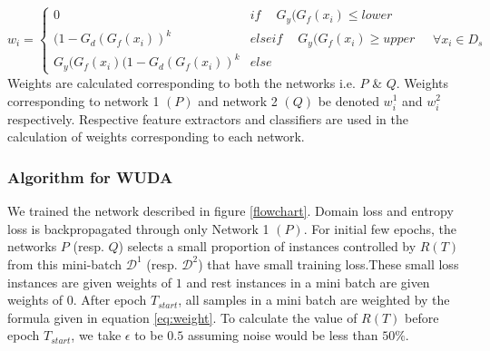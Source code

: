\begin{equation}
\label{eq:weight}
                w_{i} = \begin{cases}
		            0 & if\ \quad G_y(G_f(x_i) \le lower \\
		            (1 - G_d(G_f(x_i))^k & elseif\ \quad G_y(G_f(x_i) \ge upper \\
		            G_y(G_f(x_i)(1 - G_d(G_f(x_i))^k & else\ 
		            \end{cases} \quad \forall x_i \in D_s
\end{equation}
Weights are calculated corresponding to both the networks i.e. $P$ \& $Q$. Weights corresponding to network 1 $(P)$ and network 2 $(Q)$ be denoted $w_{i}^1$ and $w_{i}^2$ respectively. Respective feature extractors and classifiers are used in the calculation of weights corresponding to each network.  

\subsubsection{Algorithm for WUDA}
We trained the network described in figure \ref{flowchart}. Domain loss and entropy loss is backpropagated through only Network 1 $(P)$. For initial few epochs, the networks $P$ (resp. $Q$) selects a small proportion of instances controlled by $R(T)$ from this mini-batch $\mathcal{D}^1$ (resp. $\mathcal{D}^2$) that have small training loss.These small loss instances are given weights of $1$ and rest instances in a mini batch are given weights of $0$. After epoch $T_{start}$, all samples in a mini batch are weighted by the formula given in equation \ref{eq:weight}. To calculate the value of $R(T)$ before epoch $T_{start}$, we take $\epsilon$ to be $0.5$ assuming noise would be less than $50\%$.


